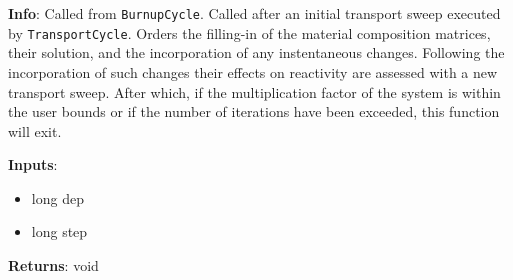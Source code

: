 \textbf{Info}: Called from \texttt{BurnupCycle}. Called after an initial 
transport sweep executed by \texttt{TransportCycle}. Orders the filling-in of
the material composition matrices, their solution, and the incorporation of any
instentaneous changes. Following the incorporation of such changes their
effects on reactivity are assessed with a new transport sweep. After which, if
the multiplication factor of the system is within the user bounds or if the
number of iterations have been exceeded, this function will exit.

\noindent \textbf{Inputs}:
\begin{itemize}
\item{long dep}
\item{long step}
\end{itemize}

\noindent \textbf{Returns}: void
